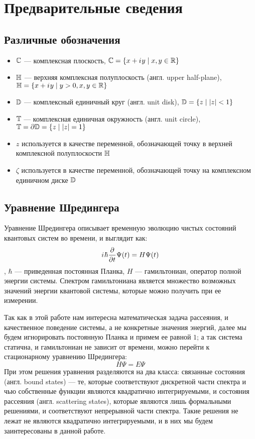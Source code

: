 \chapter{Предварительные сведения}

\section{Различные обозначения}
\begin{itemize}
\item $\mathbb{C}$ — комплексная плоскость, $\mathbb{C} = \{ x + {i\mkern1mu} y \mid x, y \in \mathbb{R} \}$ 
\item $\mathbb{H}$ — верхняя комплексная полуплоскость (англ. upper half-plane), $\mathbb{H} = \{ x + {i\mkern1mu} y \mid y > 0, x, y \in \mathbb{R} \}$
\item $\mathbb{D}$ — комплексный единичный круг (англ. unit disk), $\mathbb{D} = \{ z \mid \abs{z} < 1 \}$
\item $\mathbb{T}$ — комплексная единичная окружность (англ. unit circle), $\mathbb{T} = \partial \mathbb{D} =  \{z \mid \abs{z} = 1 \}$
\item $z$ используется в качестве переменной, обозначающей точку в верхней комплексной полуплоскости $\mathbb{H}$
\item $\zeta$ используется в качестве переменной, обозначающей точку на комплексном единичном диске $\mathbb{D}$
\end{itemize}

\section{Уравнение Шредингера}

Уравнение Шредингера описывает временную эволюцию чистых состояний квантовых систем во времени, и выглядит как:
\[
{i\mkern1mu} \hbar \pdv{t} \Psi(t) = H \Psi(t)
\]
, $\hbar$ — приведенная постоянная Планка, $H$ — гамильтониан, оператор полной энергии системы. Спектром гамильтониана является множество возможных значений энергии квантовой системы, которые можно получить при ее измерении.

Так как в этой работе нам интересна математическая задача рассеяния, и качественное поведение системы, а не конкретные значения энергий, далее мы будем игнорировать постоянную Планка и примем ее равной $1$; а так система статична, и гамильтониан не зависит от времени, можно перейти к стационарному уравнению Шредингера:
\[
H \Psi = E \Psi
\]
При этом решения уравнения разделяются на два класса: связанные состояния (англ. bound states) — те, которые соответствуют дискретной части спектра и чью собственные функции являются квадратично интегрируемыми, и состояния рассеяния (англ. scattering states), которые являются лишь формальными решениями, и соответствуют непрерывной части спектра. Такие решения не лежат не являются квадратично интегрируемыми, и в них мы будем заинтересованы в данной работе.

